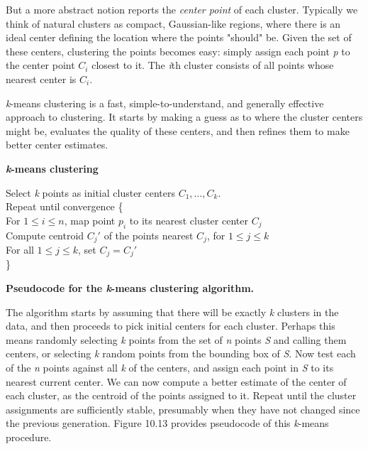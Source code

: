 \documentclass[10pt]{article}
\begin{document}
But a more abstract notion reports the \textit{center point} of each cluster. Typically we think of natural clusters as compact, Gaussian-like regions, where there is an ideal center defining the location where the points "should" be. Given the set of these centers, clustering the points becomes easy: simply assign each point \textit{p} to the center point \(C_i\) closest to it. The \textit{i}th cluster consists of all points whose nearest center is \(C_i\).

\textit{k}-means clustering is a fast, simple-to-understand, and generally effective approach to clustering. It starts by making a guess as to where the cluster centers might be, evaluates the quality of these centers, and then refines them to make better center estimates.

\begin{center}
\textbf{\textit{k}-means clustering}
\end{center}
\vspace{-.5em}
Select \textit{k} points as initial cluster centers \(C_1, \ldots, C_k\).\\
Repeat until convergence \{\\
\hspace*{1em} For \(1 \leq i \leq n\), map point \(p_i\) to its nearest cluster center \(C_j\)\\
\hspace*{1em} Compute centroid \(C_j'\) of the points nearest \(C_j\), for \(1 \leq j \leq k\)\\
\hspace*{1em} For all \(1 \leq j \leq k\), set \(C_j=C_j'\)\\
\}
\begin{center}
\textbf{Pseudocode for the \textit{k}-means clustering algorithm.}
\end{center}

The algorithm starts by assuming that there will be exactly \textit{k} clusters in the data, and then proceeds to pick initial centers for each cluster. Perhaps this means randomly selecting \textit{k} points from the set of \textit{n} points \textit{S} and calling them centers, or selecting \textit{k} random points from the bounding box of \textit{S}. Now test each of the \textit{n} points against all \textit{k} of the centers, and assign each point in \textit{S} to its nearest current center. We can now compute a better estimate of the center of each cluster, as the centroid of the points assigned to it. Repeat until the cluster assignments are sufficiently stable, presumably when they have not changed since the previous generation. Figure 10.13 provides pseudocode of this \textit{k}-means procedure.
\end{document}
